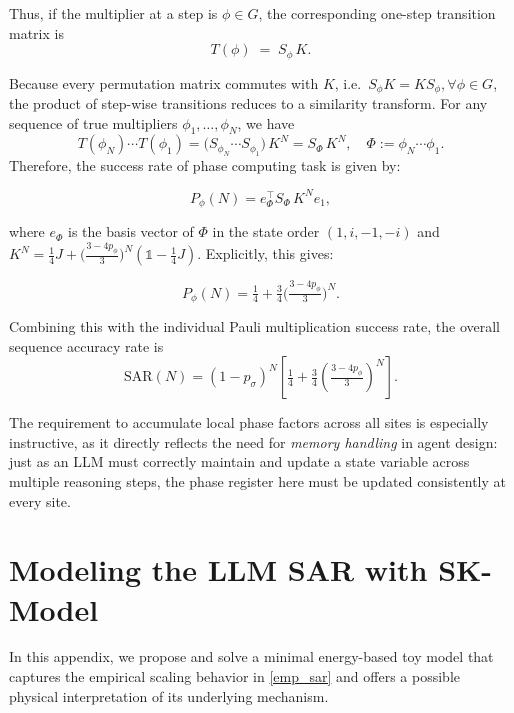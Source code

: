 \documentclass{article}
\theoremstyle{plain}
\begin{document}
Thus, if the multiplier at a step is \(\phi\in G\), the corresponding one-step transition matrix is
\begin{equation}
T(\phi)\;=\; S_\phi\, K.
\end{equation}

Because every permutation matrix commutes with $K$, i.e.\ $S_\phi K = K S_\phi, \forall \phi \in G$,
the product of step-wise transitions reduces to a similarity transform. For any sequence of true multipliers $\phi_1,\ldots,\phi_N$, we have
\begin{equation}
T(\phi_N)\cdots T(\phi_1)
= \big(S_{\phi_N}\cdots S_{\phi_1}\big)\, K^{N}
= S_{\Phi}\, K^{N},
\quad \Phi:=\phi_N\cdots\phi_1.
\end{equation}
Therefore, the success rate of phase computing task is given by:

\begin{equation}
    P_{\phi}(N)=e_{\Phi}^{\top}S_{\Phi}\, K^{N}e_{1},
\end{equation}

where $e_{\Phi}$ is the basis vector of $\Phi$ in the state order $(1,i,-1,-i)$ and $K^{N}=\tfrac{1}{4}J+\Big(\tfrac{3-4p_{\phi}}{3}\Big)^{N} (\mathds{1}-\tfrac{1}{4}J)$. Explicitly, this gives:

\begin{equation}
P_{\phi}(N)
= \tfrac14+\tfrac34\Big(\tfrac{3-4p_{\phi}}{3}\Big)^{N}.
\end{equation}

Combining this with the individual Pauli multiplication success rate, the overall sequence accuracy rate is
\begin{equation}
\text{SAR}(N) = (1-p_{\sigma})^{N}\left[\tfrac14+\tfrac34\left(\tfrac{3-4p_{\phi}}{3}\right)^{N}\right].
\end{equation}

The requirement to accumulate local phase factors across all sites is especially instructive, as it directly reflects the need for \emph{memory handling} in agent design: just as an LLM must correctly maintain and update a state variable across multiple reasoning steps, the phase register here must be updated consistently at every site.


\section{Modeling the LLM SAR with SK-Model}\label{app:sk-sar}

In this appendix, we propose and solve a minimal energy-based toy model that captures the empirical scaling behavior in \cref{emp_sar} and offers a possible physical interpretation of its underlying mechanism.
\end{document}
